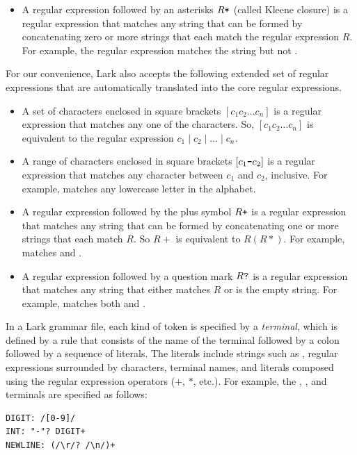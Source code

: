 \documentclass[7x10]{TimesAPriori_MIT}%
\numberwithin{theorem}{chapter}
\numberwithin{definition}{chapter}
\numberwithin{equation}{chapter}
\begin{document}
{\begin{itemize}
\item A regular expression followed by an asterisks $R\text{\texttt{*}}$ (called
  Kleene closure) is a regular expression that matches any string that
  can be formed by concatenating zero or more strings that each match
  the regular expression $R$.  For example, the regular expression
   matches the string  but not
  .
\end{itemize}

For our convenience, Lark also accepts the following extended set of
regular expressions that are automatically translated into the core
regular expressions.

\begin{itemize}
\item A set of characters enclosed in square brackets $[c_1 c_2 \ldots
  c_n]$ is a regular expression that matches any one of the
  characters. So, $[c_1 c_2 \ldots c_n]$  is equivalent to
  the regular expression $c_1\mid c_2\mid \ldots \mid c_n$.
\item A range of characters enclosed in square brackets $[c_1\text{\texttt{-}}c_2]$ is
  a regular expression that matches any character between $c_1$ and
  $c_2$, inclusive. For example, \code{[a-z]} matches any lowercase
  letter in the alphabet.
\item A regular expression followed by the plus symbol $R\text{\texttt{+}}$
  is a regular expression that matches any string that can
  be formed by concatenating one or more strings that each match $R$.
  So $R+$ is equivalent to $R(R*)$. For example, \code{[a-z]+}
  matches  and .
\item A regular expression followed by a question mark $R\text{\texttt{?}}$
  is a regular expression that matches any string that either
  matches $R$ or is the empty string.
  For example,   matches both  and .
\end{itemize}

In a Lark grammar file, each kind of token is specified by a
\emph{terminal}, which is defined by a rule
that consists of the name of the terminal followed by a colon followed
by a sequence of literals.  The literals include strings such as
, regular expressions surrounded by \code{/} characters,
terminal names, and literals composed using the regular expression
operators ($+$, $*$, etc.).  For example, the ,
, and  terminals are specified as follows:
\begin{center}
\begin{minipage}{0.95\textwidth}
\begin{lstlisting}
DIGIT: /[0-9]/
INT: "-"? DIGIT+
NEWLINE: (/\r/? /\n/)+
\end{lstlisting}
\end{minipage}
\end{center}


}
\end{document}
